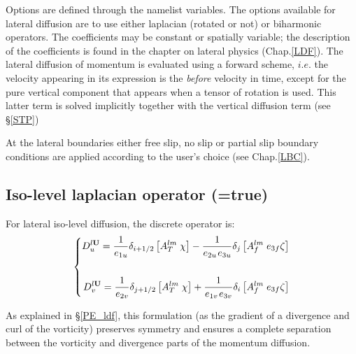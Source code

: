 \documentclass[NEMO_book]{subfiles}
\begin{document}
Options are defined through the  namelist variables.
The options available for lateral diffusion are to use either laplacian 
(rotated or not) or biharmonic operators. The coefficients may be constant 
or spatially variable; the description of the coefficients is found in the chapter 
on lateral physics (Chap.\ref{LDF}). The lateral diffusion of momentum is 
evaluated using a forward scheme, $i.e.$ the velocity appearing in its expression 
is the \textit{before} velocity in time, except for the pure vertical component 
that appears when a tensor of rotation is used. This latter term is solved 
implicitly together with the vertical diffusion term (see \S\ref{STP}) 

At the lateral boundaries either free slip, no slip or partial slip boundary 
conditions are applied according to the user's choice (see Chap.\ref{LBC}).

\subsection   [Iso-level laplacian operator (\np{ln\_dynldf\_lap}) ]
			{Iso-level laplacian operator (=true)}
\label{DYN_ldf_lap}

For lateral iso-level diffusion, the discrete operator is: 
\begin{equation} \label{Eq_dynldf_lap}
\left\{ \begin{aligned}
 D_u^{l{\rm {\bf U}}} =\frac{1}{e_{1u} }\delta _{i+1/2} \left[ {A_T^{lm} 
\;\chi } \right]-\frac{1}{e_{2u} {\kern 1pt}e_{3u} }\delta _j \left[ 
{A_f^{lm} \;e_{3f} \zeta } \right] \\ 
\\
 D_v^{l{\rm {\bf U}}} =\frac{1}{e_{2v} }\delta _{j+1/2} \left[ {A_T^{lm} 
\;\chi } \right]+\frac{1}{e_{1v} {\kern 1pt}e_{3v} }\delta _i \left[ 
{A_f^{lm} \;e_{3f} \zeta } \right] \\ 
\end{aligned} \right.
\end{equation} 

As explained in \S\ref{PE_ldf}, this formulation (as the gradient of a divergence 
and curl of the vorticity) preserves symmetry and ensures a complete 
separation between the vorticity and divergence parts of the momentum diffusion. 

\end{document}
